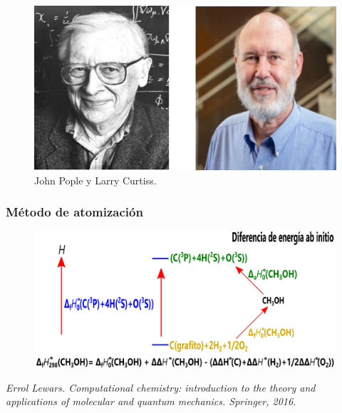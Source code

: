 \documentclass{beamer}
\begin{document}
\begin{frame}[fragile]
\begin{figure}
\includegraphics[scale=.7]{images/PC.png}
\caption{John Pople y Larry Curtiss.}
\end{figure}
\end{frame}
\begin{frame}[fragile]
\frametitle{Método de atomización}
\begin{figure}
\includegraphics[scale=.5]{images/atomization-CH3OH}
\end{figure}
\tiny{\textit{Errol Lewars. Computational chemistry: introduction to the theory and applications of molecular and quantum mechanics. Springer, 2016.}}
\end{frame}
\end{document}
